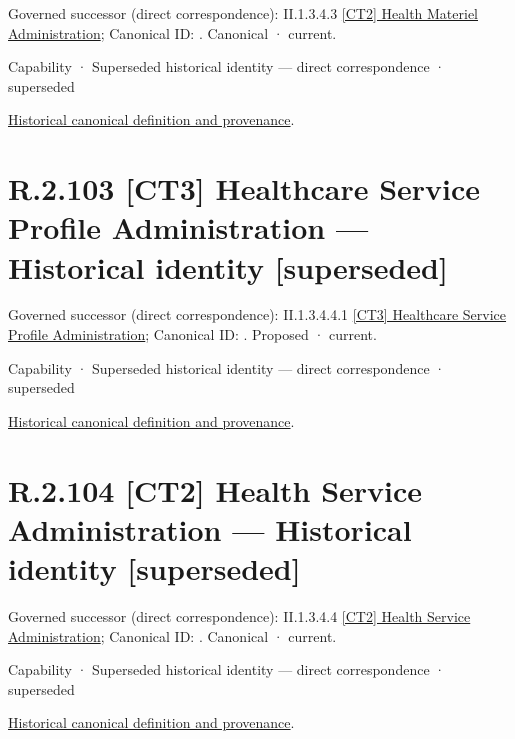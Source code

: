 {\small Governed successor (direct correspondence): II.1.3.4.3 \hyperref[element:e7081070a9f8444f81c1d8fce37ef664]{[CT2] Health Materiel Administration}; Canonical ID: \texttt{}. Canonical · current.}\par
\label{element:4952f86078c54a8d898ac992e6f4f577}
{\small Capability · Superseded historical identity — direct correspondence · superseded}\par
\href{../../../../continuum/strategy/capability/4952f86078c54a8d898ac992e6f4f577.md}{Historical canonical definition and provenance}.\par
\section*{R.2.103 [CT3] Healthcare Service Profile Administration — Historical identity [superseded]}
\label{navigation:R.2.103}

{\small Governed successor (direct correspondence): II.1.3.4.4.1 \hyperref[element:e75d5eb30936476ea7a9cbadfa43d5ef]{[CT3] Healthcare Service Profile Administration}; Canonical ID: \texttt{}. Proposed · current.}\par
\label{element:7780ca2fed2346439d5f559d00cc4ee4}
{\small Capability · Superseded historical identity — direct correspondence · superseded}\par
\href{../../../../continuum/strategy/capability/7780ca2fed2346439d5f559d00cc4ee4.md}{Historical canonical definition and provenance}.\par
\section*{R.2.104 [CT2] Health Service Administration — Historical identity [superseded]}
\label{navigation:R.2.104}

{\small Governed successor (direct correspondence): II.1.3.4.4 \hyperref[element:ba68a52913a0499d8377553bddfa74a4]{[CT2] Health Service Administration}; Canonical ID: \texttt{}. Canonical · current.}\par
\label{element:f1ab1258cf2944efb50105e7885f8027}
{\small Capability · Superseded historical identity — direct correspondence · superseded}\par
\href{../../../../continuum/strategy/capability/f1ab1258cf2944efb50105e7885f8027.md}{Historical canonical definition and provenance}.\par
